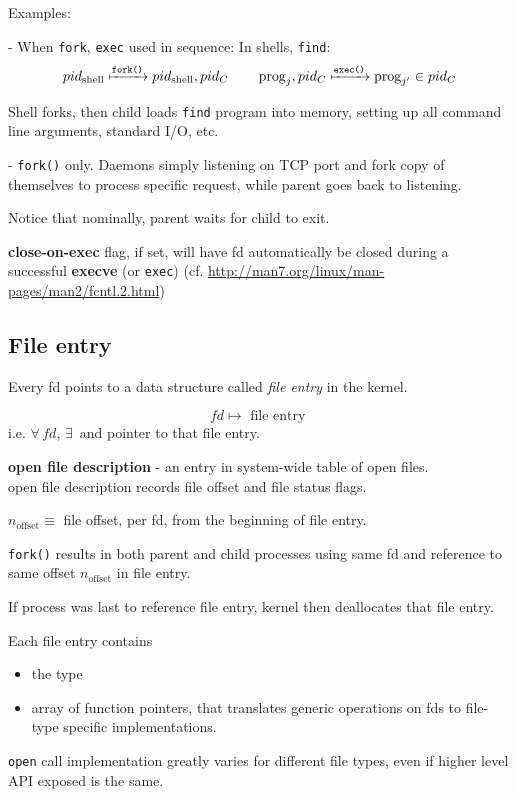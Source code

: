 \documentclass[10pt]{amsart}
\begin{document}
\begin{multicols*}{2}
Examples:

- When \texttt{fork}, \texttt{exec} used in sequence: 
In shells, \texttt{find}: 
\[
pid_{\text{shell}} \xmapsto{\texttt{fork()}} pid_{\text{shell}}, pid_C \qquad \, \text{prog}_j, pid_C \xmapsto{\texttt{exec()}} \text{prog}_{j'} \in pid_C
\] 

Shell forks, then child loads \texttt{find} program into memory, setting up all command line arguments, standard I/O, etc.

- \texttt{fork()} only.
Daemons simply listening on TCP port and fork copy of themselves to process specific request, while parent goes back to listening. 

Notice that nominally, parent waits for child to exit. 

\textbf{close-on-exec} flag, if set, will have fd automatically be closed during a successful \textbf{execve} (or \texttt{exec}) (cf. \url{http://man7.org/linux/man-pages/man2/fcntl.2.html})

\subsection{File entry}

Every fd points to a data structure called \emph{file entry} in the kernel.

\[
fd \mapsto \text{ file entry }
\]
i.e. $\forall \, fd$, $\exists \,$  and pointer to that file entry.


\textbf{open file description} - an entry in system-wide table of open files. \\
open file description records file offset and file status flags.

$n_{\text{offset}} \equiv $ file offset, per fd, from the beginning of file entry.

\texttt{fork()} results in both parent and child processes using same fd and reference to same offset $n_{\text{offset}}$ in file entry.

If process was last to reference file entry, kernel then deallocates that file entry.


Each file entry contains
\begin{itemize}
	\item the type
	\item array of function pointers, that translates generic operations on fds to file-type specific implementations.
\end{itemize}

\texttt{open} call implementation greatly varies for different file types, even if higher level API exposed is the same.


\end{multicols*}
\end{document}
